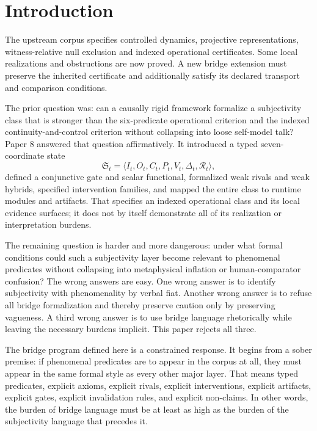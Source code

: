 \documentclass[11pt,a4paper]{article}
\theoremstyle{definition}
\newcommand{\Substate}{\mathfrak{S}}
\newcommand{\SelfIndex}{I}
\newcommand{\OwnField}{O}
\newcommand{\ContField}{C}
\newcommand{\Persp}{P}
\newcommand{\ValAsym}{V}
\newcommand{\IntervProf}{\Delta}
\newcommand{\Irred}{\mathcal{R}}
\begin{document}
\section{Introduction}
The upstream corpus specifies controlled dynamics, projective representations, witness-relative null exclusion and indexed operational certificates. Some local realizations and obstructions are now proved. A new bridge extension must preserve the inherited certificate and additionally satisfy its declared transport and comparison conditions.

The prior question was: can a causally rigid framework formalize a subjectivity class that is stronger than the six-predicate operational criterion and the indexed continuity-and-control criterion without collapsing into loose self-model talk? Paper 8 answered that question affirmatively. It introduced a typed seven-coordinate state
\[
\Substate_t=\langle \SelfIndex_t,\OwnField_t,\ContField_t,\Persp_t,\ValAsym_t,\IntervProf_t,\Irred_t \rangle,
\]
defined a conjunctive gate and scalar functional, formalized weak rivals and weak hybrids, specified intervention families, and mapped the entire class to runtime modules and artifacts. That specifies an indexed operational class and its local evidence surfaces; it does not by itself demonstrate all of its realization or interpretation burdens.

The remaining question is harder and more dangerous: under what formal conditions could such a subjectivity layer become relevant to phenomenal predicates without collapsing into metaphysical inflation or human-comparator confusion? The wrong answers are easy. One wrong answer is to identify subjectivity with phenomenality by verbal fiat. Another wrong answer is to refuse all bridge formalization and thereby preserve caution only by preserving vagueness. A third wrong answer is to use bridge language rhetorically while leaving the necessary burdens implicit. This paper rejects all three.

The bridge program defined here is a constrained response. It begins from a sober premise: if phenomenal predicates are to appear in the corpus at all, they must appear in the same formal style as every other major layer. That means typed predicates, explicit axioms, explicit rivals, explicit interventions, explicit artifacts, explicit gates, explicit invalidation rules, and explicit non-claims. In other words, the burden of bridge language must be at least as high as the burden of the subjectivity language that precedes it.
\end{document}
